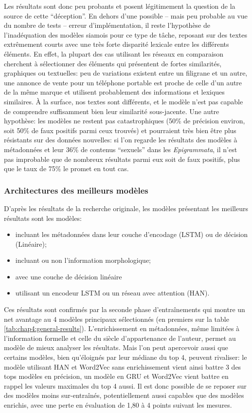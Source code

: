 Les résultats sont donc peu probants et posent légitimement la question de la source de cette \enquote{déception}. En dehors d'une possible -- mais peu probable au vue du nombre de tests -- erreur d'implémentation, il reste l'hypothèse de l'inadéquation des modèles siamois pour ce type de tâche, reposant sur des textes extrêmement courts avec une très forte disparité lexicale entre les différents éléments. En effet, la plupart des cas utilisant les réseaux en comparaison cherchent à sélectionner des éléments qui présentent de fortes similarités, graphiques ou textuelles: peu de variations existent entre un filigrane et un autre, une annonce de vente pour un téléphone portable est proche de celle d'un autre de la même marque et utilisent probablement des informations et lexiques similaires. À la surface, nos textes sont différents, et le modèle n'est pas capable de comprendre suffisamment bien leur similarité sous-jacente. Une autre hypothèse: les modèles ne restent pas catastrophiques (50\% de précision environ, soit 50\% de faux positifs parmi ceux trouvés) et pourraient très bien être plus résistants sur des données nouvelles: si l'on regarde les résultats des modèles à métadonnées et leur 36\% de contenus \enquote{sexuels} dans les \textit{Epigrammata}, il n'est pas improbable que de nombreux résultats parmi eux soit de faux positifs, plus que le taux de 75\% le promet en tout cas.

\subsubsection{Architectures des meilleurs modèles}

D'après les résultats de la recherche originale, les modèles présentant les meilleurs résultats sont les modèles:
\begin{itemize}
    \item incluant les métadonnées dans leur couche d'encodage (LSTM) ou de décision (Linéaire);
    \item incluant ou non l'information morphologique;
    \item avec une couche de décision linéaire
    \item utilisant un encodeur LSTM ou un réseau avec attention (HAN).
\end{itemize}

Ces résultats sont confirmés par la seconde phase d'entraînements qui montre un net avantage au 4 modèles principaux sélectionnés (en premiers sur la table \ref{tab:chap4:general-results}). L'enrichissement en métadonnées, même limitées à l'information formelle et celle du siècle d'appartenance de l'auteur, permet au modèle de mieux analyser les résultats. Mais l'on peut apercevoir aussi que certains modèles, bien qu'éloignés par leur médiane du top 4, peuvent rivaliser: le modèle utilisant HAN et Word2Vec sans enrichissement vient ainsi battre 3 des tops modèles en précision, un modèle en GRU et Word2Vec vient battre en rappel les valeurs maximales du top 4 aussi. Il est donc possible de se reposer sur des modèles moins sur-entraînés, potentiellement aussi capables que des modèles enrichis, avec une perte en évaluation de 1,80 à 4 points suivant les mesures.

